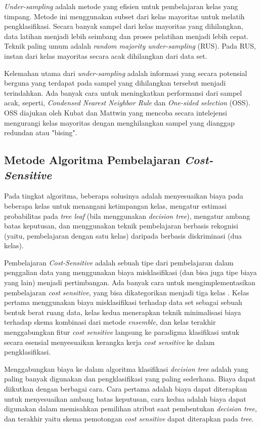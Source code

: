 \documentclass[12pt,a4paper,titlepage]{article}
\begin{document}
\textit{Under-sampling} adalah metode yang efisien untuk pembelajaran kelas yang timpang.
Metode ini menggunakan subset dari kelas mayoritas untuk melatih pengklasifikasi.
Secara banyak sampel dari kelas mayoritas yang dihilangkan, data latihan menjadi lebih seimbang dan proses pelatihan menjadi lebih cepat.
Teknik paling umum adalah \textit{random majority under-sampling} (RUS).
Pada RUS, instan dari kelas mayoritas secara acak dihilangkan dari data set.

Kelemahan utama dari \textit{under-sampling} adalah informasi yang secara potensial berguna yang terdapat pada sampel yang dihilangkan tersebut menjadi terindahkan.
Ada banyak cara untuk meningkatkan performansi dari sampel acak, seperti, \textit{Condensed Nearest Neighbor Rule} dan \textit{One-sided selection} (OSS).
OSS diajukan oleh Kubat dan Mattwin \cite{kubat1997addressing} yang mencoba secara intelejensi mengurangi kelas mayoritas dengan menghilangkan sampel yang dianggap redundan atau "bising".

\subsection{Metode Algoritma Pembelajaran \textit{Cost-Sensitive}}

Pada tingkat algoritma, beberapa solusinya adalah menyesuaikan biaya pada beberapa kelas untuk menangani ketimpangan kelas, mengatur estimasi probabilitas pada \textit{tree leaf} (bila menggunakan \textit{decision tree}), mengatur ambang batas keputusan, dan menggunakan teknik pembelajaran berbasis rekognisi (yaitu, pembelajaran dengan satu kelas) daripada berbasis diskriminasi (dua kelas).

Pembelajaran \textit{Cost-Sensitive} adalah sebuah tipe dari pembelajaran dalam penggalian data yang menggunakan biaya misklasifikasi (dan bisa juga tipe biaya yang lain) menjadi pertimbangan.
Ada banyak cara untuk mengimplementasikan pembelajaran \textit{cost sensitive}, yang bisa dikategorikan menjadi tiga kelas \cite{he2009learning}.
Kelas pertama menggunakan biaya misklasifikasi terhadap data set sebagai sebuah bentuk berat ruang data, kelas kedua menerapkan teknik minimalisasi biaya terhadap skema kombinasi dari metode \textit{ensemble}, dan kelas terakhir menggabungkan fitur \textit{cost sensitive} langsung ke paradigma klasifikasi untuk secara esensial menyesuaikan kerangka kerja \textit{cost sensitive} ke dalam pengklasifikasi.

Menggabungkan biaya ke dalam algoritma klasifikasi \textit{decision tree} adalah yang paling banyak digunakan dan pengklasifikasi yang paling sederhana.
Biaya dapat diikutkan dengan berbagai cara.
Cara pertama adalah biaya dapat diterapkan untuk menyesuaikan ambang batas keputusan, cara kedua adalah biaya dapat digunakan dalam memisahkan pemilihan atribut saat pembentukan \textit{decision tree}, dan terakhir yaitu skema pemotongan \textit{cost sensitive} dapat diterapkan pada \textit{tree}.
\end{document}
